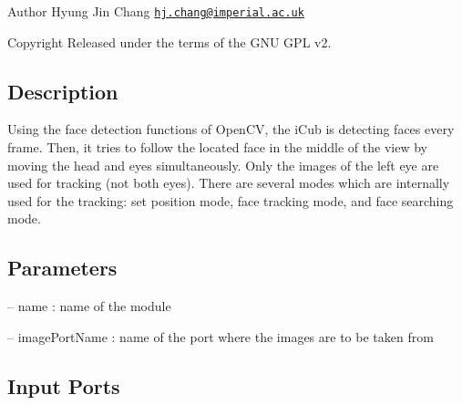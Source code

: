 \begin{DoxyAuthor}{Author}
Hyung Jin Chang \href{mailto:hj.chang@imperial.ac.uk}{\tt hj.\+chang@imperial.\+ac.\+uk} ~\newline
 
\end{DoxyAuthor}
\begin{DoxyCopyright}{Copyright}
Released under the terms of the G\+NU G\+PL v2. 
\end{DoxyCopyright}
\hypertarget{group__touchDetector_intro_sec}{}\subsection{Description}\label{group__touchDetector_intro_sec}
Using the face detection functions of Open\+CV, the i\+Cub is detecting faces every frame. Then, it tries to follow the located face in the middle of the view by moving the head and eyes simultaneously. Only the images of the left eye are used for tracking (not both eyes). There are several modes which are internally used for the tracking\+: \textquotesingle{}set position mode\textquotesingle{}, \textquotesingle{}face tracking mode, and \textquotesingle{}face searching mode\textquotesingle{}.\hypertarget{group__touchDetector_parameters_sec}{}\subsection{Parameters}\label{group__touchDetector_parameters_sec}

\begin{DoxyItemize}
\item -- name \+: name of the module
\item -- image\+Port\+Name \+: name of the port where the images are to be taken from 
\end{DoxyItemize}\hypertarget{group__touchDetector_inputports_sec}{}\subsection{Input Ports}\label{group__touchDetector_inputports_sec}

